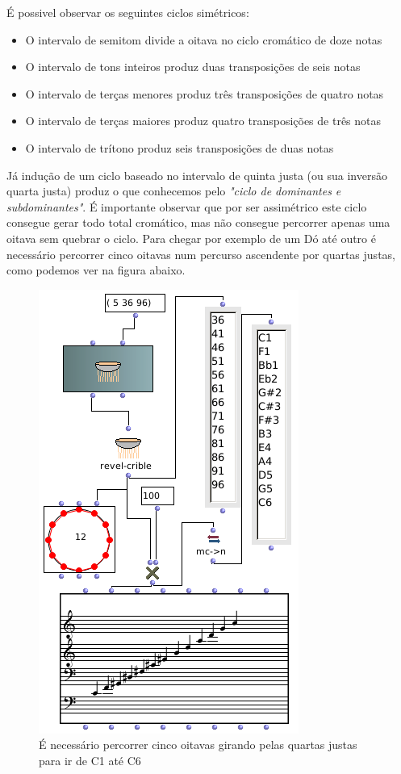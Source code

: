 \documentclass[
	12pt,				%
	openright,			%
	twoside,			%
	a4paper,			%
	english,			%
	french,				%
	spanish,			%
	brazil				%
	]{abntex2}
\begin{document}
É possivel observar os seguintes ciclos simétricos:

\begin{itemize}
\item O intervalo de semitom divide a oitava no ciclo cromático de doze notas
\item O intervalo de tons inteiros produz duas transposições de seis notas
\item O intervalo de terças menores produz três transposições de quatro notas
\item O intervalo de terças maiores produz quatro transposições de três notas
\item O intervalo de trítono produz seis transposições de duas notas
\end{itemize}

Já indução de um ciclo baseado no intervalo de quinta justa (ou sua inversão quarta justa) produz o que conhecemos pelo \textit{"ciclo de dominantes e subdominantes"}. É importante observar que por ser assimétrico este ciclo consegue gerar todo total cromático, mas não consegue percorrer apenas uma oitava sem quebrar o ciclo. Para chegar por exemplo de um Dó até outro é necessário percorrer cinco oitavas num percurso ascendente por quartas justas, como podemos ver na figura abaixo.


\begin{figure}[!h]
	\caption{\label{fig_grafico}É necessário percorrer cinco oitavas girando pelas quartas justas para ir de C1 até C6  }
	\begin{center}
	    \includegraphics[scale=0.5]{ciclos/5JcrivosOM.png}
	\end{center}
\end{figure}
\end{document}

